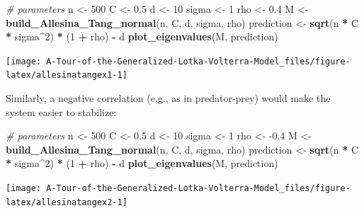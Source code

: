 \documentclass[
]{book}
\newenvironment{Shaded}{\begin{snugshade}}{\end{snugshade}}
\newcommand{\CommentTok}[1]{\textcolor[rgb]{0.56,0.35,0.01}{\textit{#1}}}
\newcommand{\DecValTok}[1]{\textcolor[rgb]{0.00,0.00,0.81}{#1}}
\newcommand{\FloatTok}[1]{\textcolor[rgb]{0.00,0.00,0.81}{#1}}
\newcommand{\KeywordTok}[1]{\textcolor[rgb]{0.13,0.29,0.53}{\textbf{#1}}}
\newcommand{\NormalTok}[1]{#1}
\newcommand{\OperatorTok}[1]{\textcolor[rgb]{0.81,0.36,0.00}{\textbf{#1}}}
\newcommand{\StringTok}[1]{\textcolor[rgb]{0.31,0.60,0.02}{#1}}
\begin{document}
\begin{Shaded}
\begin{Highlighting}[]
\CommentTok{# parameters}
\NormalTok{n <-}\StringTok{ }\DecValTok{500}
\NormalTok{C <-}\StringTok{ }\FloatTok{0.5}
\NormalTok{d <-}\StringTok{ }\DecValTok{10}
\NormalTok{sigma <-}\StringTok{ }\DecValTok{1}
\NormalTok{rho <-}\StringTok{ }\FloatTok{0.4}
\NormalTok{M <-}\StringTok{ }\KeywordTok{build_Allesina_Tang_normal}\NormalTok{(n, C, d, sigma, rho)}
\NormalTok{prediction <-}\StringTok{ }\KeywordTok{sqrt}\NormalTok{(n }\OperatorTok{*}\StringTok{ }\NormalTok{C }\OperatorTok{*}\StringTok{ }\NormalTok{sigma}\OperatorTok{^}\DecValTok{2}\NormalTok{) }\OperatorTok{*}\StringTok{ }\NormalTok{(}\DecValTok{1} \OperatorTok{+}\StringTok{ }\NormalTok{rho) }\OperatorTok{-}\StringTok{ }\NormalTok{d}
\KeywordTok{plot_eigenvalues}\NormalTok{(M, prediction)}
\end{Highlighting}
\end{Shaded}

\begin{center}\texttt{[image: A-Tour-of-the-Generalized-Lotka-Volterra-Model\_files/figure-latex/allesinatangex1-1]} \end{center}

Similarly, a negative correlation (e.g., as in predator-prey) would make the system easier to stabilize:

\begin{Shaded}
\begin{Highlighting}[]
\CommentTok{# parameters}
\NormalTok{n <-}\StringTok{ }\DecValTok{500}
\NormalTok{C <-}\StringTok{ }\FloatTok{0.5}
\NormalTok{d <-}\StringTok{ }\DecValTok{10}
\NormalTok{sigma <-}\StringTok{ }\DecValTok{1}
\NormalTok{rho <-}\StringTok{ }\FloatTok{-0.4}
\NormalTok{M <-}\StringTok{ }\KeywordTok{build_Allesina_Tang_normal}\NormalTok{(n, C, d, sigma, rho)}
\NormalTok{prediction <-}\StringTok{ }\KeywordTok{sqrt}\NormalTok{(n }\OperatorTok{*}\StringTok{ }\NormalTok{C }\OperatorTok{*}\StringTok{ }\NormalTok{sigma}\OperatorTok{^}\DecValTok{2}\NormalTok{) }\OperatorTok{*}\StringTok{ }\NormalTok{(}\DecValTok{1} \OperatorTok{+}\StringTok{ }\NormalTok{rho) }\OperatorTok{-}\StringTok{ }\NormalTok{d}
\KeywordTok{plot_eigenvalues}\NormalTok{(M, prediction)}
\end{Highlighting}
\end{Shaded}

\begin{center}\texttt{[image: A-Tour-of-the-Generalized-Lotka-Volterra-Model\_files/figure-latex/allesinatangex2-1]} \end{center}
\end{document}
